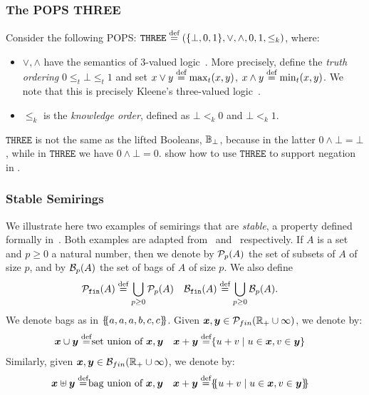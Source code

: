 \subsubsection{The POPS THREE} \label{subsec:three:pops}

Consider the following POPS:
$\texttt{THREE} \stackrel{\text{def}}{=} (\{\bot, 0,  1\}, \vee, \wedge,  0,
 1, \leq_k)$, where:
\begin{itemize}
\item $\vee, \wedge$ have the semantics of 3-valued
  logic~\cite{DBLP:journals/jlp/Fitting85a}.  More precisely, define
  the {\em truth ordering} $0 \leq_t \bot \leq_t 1$ and set
  $x \vee y \stackrel{\text{def}}{=} \max_t(x,y)$, $x \wedge y \stackrel{\text{def}}{=} \min_t(x,y)$.  We
  note that this is precisely Kleene's three-valued
  logic~\cite{DBLP:journals/logcom/Fitting91}.
\item $\leq_k$ is the {\em knowledge order\/}, defined as
  $\bot <_k  0$ and $\bot <_k  1$.
\end{itemize}
%
$\texttt{THREE}$ is not the same as the lifted Booleans, $\mathbb B_\bot$,
because in the latter $0 \wedge \bot = \bot$, while in
$\texttt{THREE}$ we have $0 \wedge \bot = 0$.  
\cite{DBLP:conf/pods/Khamis0PSW22} show how to use $\texttt{THREE}$ to support 
 negation in \datalogo.

\subsubsection{Stable Semirings}
\label{subsec:stable:semirings}

We illustrate here two examples of semirings that are {\em stable}, a
property defined formally in~\cite{DBLP:conf/pods/Khamis0PSW22}.  
Both
examples are adapted from~\cite[Example 7.1.4]{semiring_book}
and~\cite[Chapt.8, Sec.1.3.2]{semiring_book} respectively.  If $A$ is
a set and $p \geq 0$ a natural number, then we denote by $\mathcal P_p(A)$
the set of subsets of $A$ of size $p$, and by $\mathcal B_p(A)$ the set of
bags of $A$ of size $p$.  We also define
\begin{align*}
    \mathcal P_{\texttt{fin}}(A) &\stackrel{\text{def}}{=} \bigcup_{p\geq 0}\mathcal P_p(A) &
    \mathcal B_{\texttt{fin}}(A) & \stackrel{\text{def}}{=} \bigcup_{p\geq 0}\mathcal B_p(A).
     &
\end{align*}
We denote bags as in $\{\hspace{-1mm}\{a,a,a,b,c,c\}\hspace{-1mm}\}$.  Given
$\bm x,\bm y \in \mathcal P_{fin}(\mathbb R_+ \cup \infty)$, we denote by:
%
\begin{align*}
  \bm x \cup \bm y \stackrel{\text{def}}{=} & \mbox{set union of $\bm x,\bm y$} &
  \bm x + \bm y \stackrel{\text{def}}{=} & \{{u+v}\mid{u \in \bm x, v \in \bm y}\}
\end{align*}
%
Similarly, given $\bm x,\bm y \in \mathcal B_{fin}(\mathbb R_+ \cup \infty)$, we denote
by:
%
\begin{align*}
  \bm x \uplus \bm y \stackrel{\text{def}}{=} & \mbox{bag union of $\bm x,\bm y$} &
  \bm x + \bm y \stackrel{\text{def}}{=} & \{\hspace{-1mm}\{{u+v}\mid{u \in \bm x, v \in \bm y}\}\hspace{-1mm}\}
\end{align*}


